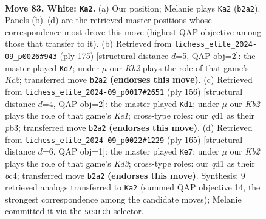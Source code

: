 \documentclass[11pt]{article}
\begin{document}
\clearpage

\begin{figure}[p]\centering
\begin{subfigure}{0.46\textwidth}\centering
\resizebox{\linewidth}{!}{%
\newchessgame
\chessboard[
  setfen={8/8/1p6/p3k3/2P5/8/1K6/3q4 w - - 22 83},
  showmover=false,
  pgfstyle=straightmove, color=movearrow, markmove={b2-a2}
]}
\caption{}
\end{subfigure}\hfill
\begin{subfigure}{0.46\textwidth}\centering
\resizebox{\linewidth}{!}{%
\newchessgame
\chessboard[
  setfen={8/2k5/p7/P2K4/1P6/8/8/8 b - - 14 88},
  showmover=false,
  pgfstyle=straightmove, color=movearrow, markmove={c7-d7}
]}
\caption{}
\end{subfigure}
\\[4pt]
\begin{subfigure}{0.46\textwidth}\centering
\resizebox{\linewidth}{!}{%
\newchessgame
\chessboard[
  setfen={8/8/8/3k2p1/5pP1/1p6/8/4K3 w - - 0 79},
  showmover=false,
  pgfstyle=straightmove, color=movearrow, markmove={e1-d1}
]}
\caption{}
\end{subfigure}\hfill
\begin{subfigure}{0.46\textwidth}\centering
\resizebox{\linewidth}{!}{%
\newchessgame
\chessboard[
  setfen={8/8/3k2K1/p7/P1B4P/6P1/8/8 b - - 0 83},
  showmover=false,
  pgfstyle=straightmove, color=movearrow, markmove={d6-e7}
]}
\caption{}
\end{subfigure}
\caption{\textbf{Move 83, White: \texttt{Ka2}.} (a) Our position; Melanie plays \texttt{Ka2} (\texttt{b2a2}). Panels (b)--(d) are the retrieved master positions whose correspondence most drove this move (highest QAP objective among those that transfer to it). (b) Retrieved from \texttt{lichess\_elite\_2024-09\_p0026\#943} (ply 175) [structural distance $d$=5, QAP obj=2]: the master played \texttt{Kd7}; under $\mu$ our \emph{Kb2} plays the role of that game's \emph{Kc2}; transferred move \texttt{b2a2} \textbf{(endorses this move)}. (c) Retrieved from \texttt{lichess\_elite\_2024-09\_p0017\#2651} (ply 156) [structural distance $d$=4, QAP obj=2]: the master played \texttt{Kd1}; under $\mu$ our \emph{Kb2} plays the role of that game's \emph{Ke1}; cross-type roles: our \emph{q}d1 as their \emph{p}b3; transferred move \texttt{b2a2} \textbf{(endorses this move)}. (d) Retrieved from \texttt{lichess\_elite\_2024-09\_p0022\#1229} (ply 165) [structural distance $d$=6, QAP obj=1]: the master played \texttt{Ke7}; under $\mu$ our \emph{Kb2} plays the role of that game's \emph{Kd3}; cross-type roles: our \emph{q}d1 as their \emph{b}c4; transferred move \texttt{b2a2} \textbf{(endorses this move)}. Synthesis: 9 retrieved analogs transferred to \texttt{Ka2} (summed QAP objective 14, the strongest correspondence among the candidate moves); Melanie committed it via the \texttt{search} selector.}
\label{fig:thought-m164}
\end{figure}
\end{document}
